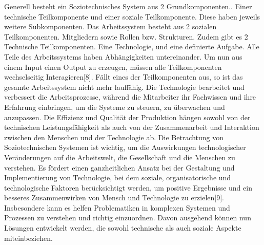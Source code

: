 \documentclass[journal=tosc,final]{iacrtrans}
\begin{document}
Generell besteht ein Soziotechnisches System aus 2 Grundkomponenten.. Einer technische Teilkomponente und einer soziale Teilkomponente. Diese haben jeweils weitere Subkomponenten. Das Arbeitssystem besteht aus 2 sozialen Teilkomponenten. Mitgliedern sowie Rollen bzw. Strukturen. Zudem gibt es 2 Technische Teilkomponenten. Eine Technologie, und eine definierte Aufgabe. Alle Teile des Arbeitssystems haben Abhängigkeiten untereinander. Um nun aus einem Input einen Output zu erzeugen, müssen alle Teilkomponenten wechselseitig Interagieren[8]. Fällt eines der Teilkomponenten aus, so ist das gesamte Arbeitssystem nicht mehr lauffähig. Die Technologie bearbeitet und verbessert die Arbeitsprozesse, während die Mitarbeiter ihr Fachwissen und ihre Erfahrung einbringen, um die Systeme zu steuern, zu überwachen und anzupassen. Die Effizienz und Qualität der Produktion hängen sowohl von der technischen Leistungsfähigkeit als auch von der Zusammenarbeit und Interaktion zwischen den Menschen und der Technologie ab. Die Betrachtung von Soziotechnischen Systemen ist wichtig, um die Auswirkungen technologischer Veränderungen auf die Arbeitswelt, die Gesellschaft und die Menschen zu verstehen. Es fördert einen ganzheitlichen Ansatz bei der Gestaltung und Implementierung von Technologie, bei dem soziale, organisatorische und technologische Faktoren berücksichtigt werden, um positive Ergebnisse und ein besseres Zusammenwirken von Mensch und Technologie zu erzielen[9]. Insbesondere kann es helfen Problematiken in komplexen Systemen und Prozessen zu verstehen und richtig einzuordnen. Davon ausgehend können nun Lösungen entwickelt werden, die sowohl technische als auch soziale Aspekte miteinbeziehen.  
\newpage
\end{document}
